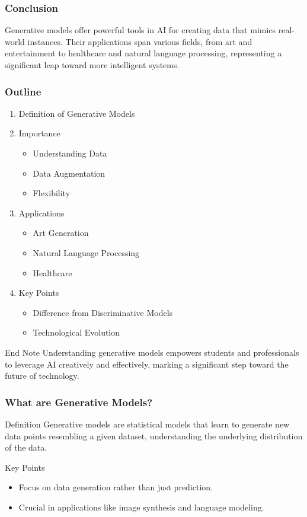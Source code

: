 \documentclass[aspectratio=169]{beamer}
\begin{document}
\begin{frame}[fragile]
    \frametitle{Conclusion}
    Generative models offer powerful tools in AI for creating data that mimics real-world instances. Their applications span various fields, from art and entertainment to healthcare and natural language processing, representing a significant leap toward more intelligent systems.
\end{frame}

\begin{frame}[fragile]
    \frametitle{Outline}
    \begin{enumerate}
        \item Definition of Generative Models
        \item Importance
        \begin{itemize}
            \item Understanding Data
            \item Data Augmentation
            \item Flexibility
        \end{itemize}
        \item Applications
        \begin{itemize}
            \item Art Generation
            \item Natural Language Processing
            \item Healthcare
        \end{itemize}
        \item Key Points
        \begin{itemize}
            \item Difference from Discriminative Models
            \item Technological Evolution
        \end{itemize}
    \end{enumerate}
    
    \begin{block}{End Note}
        Understanding generative models empowers students and professionals to leverage AI creatively and effectively, marking a significant step toward the future of technology.
    \end{block}
\end{frame}

\begin{frame}[fragile]
    \frametitle{What are Generative Models?}
    \begin{block}{Definition}
        Generative models are statistical models that learn to generate new data points resembling a given dataset, understanding the underlying distribution of the data.
    \end{block}
    \begin{block}{Key Points}
        \begin{itemize}
            \item Focus on data generation rather than just prediction.
            \item Crucial in applications like image synthesis and language modeling.
        \end{itemize}
    \end{block}
\end{frame}
\end{document}
